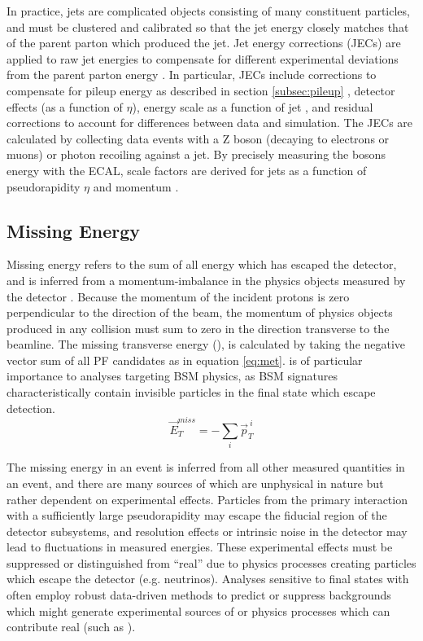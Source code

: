 In practice, jets are complicated objects consisting of many constituent particles, and must be clustered and calibrated so that the jet energy closely matches that of the parent parton which produced the jet. Jet energy corrections (JECs) are applied to raw jet energies to compensate for different experimental deviations from the parent parton energy \cite{Khachatryan:2016kdb,CMS-DP-2016-020}. In particular, JECs include corrections to compensate for pileup energy as described in section \ref{subsec:pileup} \cite{Cacciari:2007fd}, detector effects (as a function of $\eta$), energy scale as a function of jet \pt, and residual corrections to account for differences between data and simulation. The JECs are calculated by collecting data events with a Z boson (decaying to electrons or muons) or photon recoiling against a jet. By precisely measuring the bosons energy with the ECAL, scale factors are derived for jets as a function of pseudorapidity $\eta$ and momentum \pt. 

\subsection{Missing Energy}
\label{subsec:met}
Missing energy refers to the sum of all energy which has escaped the detector, and is inferred from a momentum-imbalance in the physics objects measured by the detector \cite{Chatrchyan:2011tn}. Because the momentum of the incident protons is zero perpendicular to the direction of the beam, the momentum of physics objects produced in any collision must sum to zero in the direction transverse to the beamline. The missing transverse energy (\MET), is calculated by taking the negative vector sum of all PF candidates as in equation \ref{eq:met}. \MET is of particular importance to analyses targeting BSM physics, as BSM signatures characteristically contain invisible particles in the final state which escape detection.
\begin{equation}
	\label{eq:met}
	\vec{E}_T^{miss}=-\sum_i^{} \vec{p}_T^{\: i}
\end{equation}

The missing energy in an event is inferred from all other measured quantities in an event, and there are many sources of \MET which are unphysical in nature but rather dependent on experimental effects. Particles from the primary interaction with a sufficiently large pseudorapidity may escape the fiducial region of the detector subsystems, and resolution effects or intrinsic noise in the detector may lead to fluctuations in measured energies. These experimental effects must be suppressed or distinguished from ``real'' \MET due to physics processes creating particles which escape the detector (e.g. neutrinos). Analyses sensitive to final states with \MET often employ robust data-driven methods to predict or suppress backgrounds which might generate experimental sources of \MET or physics processes which can contribute real \MET (such as \znunu).

